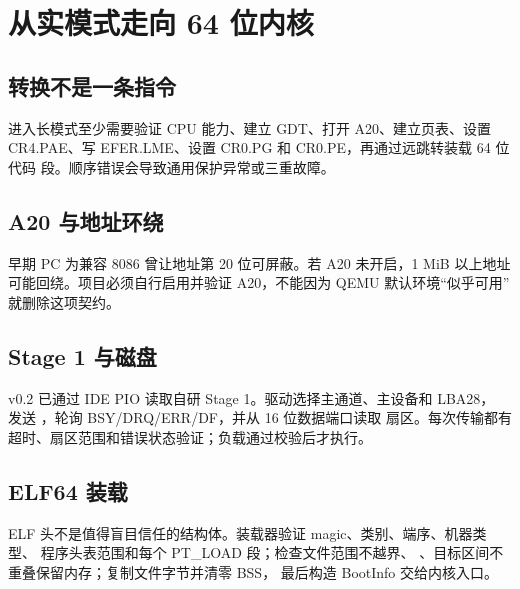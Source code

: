 \section{从实模式走向 64 位内核}

\subsection{转换不是一条指令}

进入长模式至少需要验证 CPU 能力、建立 GDT、打开 A20、建立页表、设置
CR4.PAE、写 EFER.LME、设置 CR0.PG 和 CR0.PE，再通过远跳转装载 64 位代码
段。顺序错误会导致通用保护异常或三重故障。

\begin{center}
\end{center}

\subsection{A20 与地址环绕}

早期 PC 为兼容 8086 曾让地址第 20 位可屏蔽。若 A20 未开启，1 MiB 以上地址
可能回绕。项目必须自行启用并验证 A20，不能因为 QEMU 默认环境“似乎可用”
就删除这项契约。

\subsection{Stage 1 与磁盘}

v0.2 已通过 IDE PIO 读取自研 Stage 1。驱动选择主通道、主设备和 LBA28，
发送 ，轮询 BSY/DRQ/ERR/DF，并从 16 位数据端口读取
扇区。每次传输都有超时、扇区范围和错误状态验证；负载通过校验后才执行。

\subsection{ELF64 装载}

ELF 头不是值得盲目信任的结构体。装载器验证 magic、类别、端序、机器类型、
程序头表范围和每个 PT\_LOAD 段；检查文件范围不越界、
、目标区间不重叠保留内存；复制文件字节并清零 BSS，
最后构造 BootInfo 交给内核入口。

